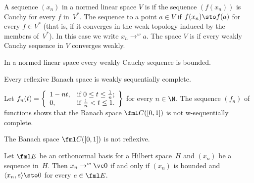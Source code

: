 \begin{defn} A sequence $(x_n)$ in a normed linear space $V$ is
 if the sequence $(f(x_n))$ is Cauchy for every $f$ in~$V^*$.  The
sequence
 to a point $a \in V$ if $f(x_n) \sto f(a)$ for every $f \in V^*$
(that is, if it converges in the weak topology induced by the members of~$V^*$). In this
case we write
$x_n \to^w a$.  The space $V$ is
 if every weakly Cauchy sequence in $V$ converges weakly.
\end{defn}

\begin{prop} In a normed linear space every weakly Cauchy sequence is bounded.
\end{prop}

\begin{prop} Every reflexive Banach space is weakly sequentially complete.
\end{prop}

\begin{exam} Let $f_n(t) = \left\{
                             \begin{array}{ll}
                               1 - nt, & \hbox{if $0 \le t \le \frac1n$;} \\
                               0, & \hbox{if $\frac1n < t \le 1$.}
                             \end{array}
                           \right\}$ for every $n \in \N$. The sequence $(f_n)$ of functions shows that the Banach
space $\fml C([0,1])$ is not w-sequentially complete.
\end{exam}

\begin{cor} The Banach space $\fml C([0,1])$ is not reflexive.
\end{cor}

\begin{prop} Let $\fml E$ be an orthonormal basis for a Hilbert space~$H$ and $(x_n)$ be a
sequence in~$H$. Then $x_n \to^w \vc 0$ if and only if $(x_n)$ is bounded and $\langle
x_n,e \rangle \sto 0$ for every $e \in \fml E$.
\end{prop}

